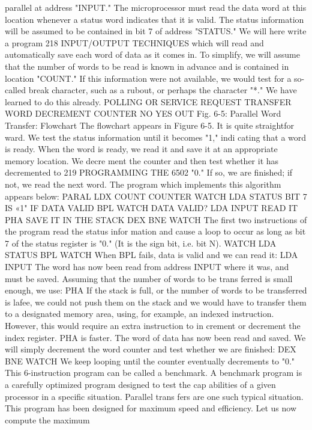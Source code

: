 parallel at address "INPUT." The microprocessor must read the
data word at this location whenever a status word indicates that
it is valid. The status information will be assumed to be contained
in bit 7 of address "STATUS." We will here write a program
218
INPUT/OUTPUT TECHNIQUES
which will read and automatically save each word of data as it
comes in. To simplify, we will assume that the number of words
to be read is known in advance and is contained in location
"COUNT." If this information were not available, we would test
for a so-called break character, such as a rubout, or perhaps the
character "*." We have learned to do this already.
POLLING OR SERVICE REQUEST
TRANSFER
WORD
DECREMENT
COUNTER
NO
YES
OUT
Fig. 6-5: Parallel Word Transfer: Flowchart
The flowchart appears in Figure 6-5. It is quite straightfor
ward. We test the status information until it becomes "1," indi
cating that a word is ready. When the word is ready, we read
it and save it at an appropriate memory location. We decre
ment the counter and then test whether it has decremented to
219
PROGRAMMING THE 6502
"0." If so, we are finished; if not, we read the next word. The
program which implements this algorithm appears below:
PARAL LDX COUNT COUNTER
WATCH LDA STATUS BIT 7 IS «1" IF DATA VALID
BPL WATCH DATA VALID?
LDA INPUT READ IT
PHA SAVE IT IN THE STACK
DEX
BNE WATCH
The first two instructions of the program read the status infor
mation and cause a loop to occur as long as bit 7 of the status
register is "0." (It is the sign bit, i.e. bit N).
WATCH LDA STATUS
BPL WATCH
When BPL fails, data is valid and we can read it:
LDA INPUT
The word has now been read from address INPUT where it was,
and must be saved. Assuming that the number of words to be trans
ferred is small enough, we use:
PHA
If the stack is full, or the number of words to be transferred is lafee,
we could not push them on the stack and we would have to transfer
them to a designated memory area, using, for example, an indexed
instruction. However, this would require an extra instruction to in
crement or decrement the index register. PHA is faster.
The word of data has now been read and saved. We will simply
decrement the word counter and test whether we are finished:
DEX
BNE WATCH
We keep looping until the counter eventually decrements to "0."
This 6-instruction program can be called a benchmark. A benchmark
program is a carefully optimized program designed to test the cap
abilities of a given processor in a specific situation. Parallel trans
fers are one such typical situation. This program has been designed
for maximum speed and efficiency. Let us now compute the maximum

